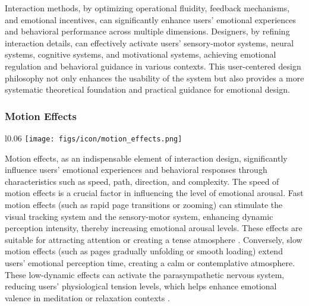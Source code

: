 Interaction methods, by optimizing operational fluidity, feedback mechanisms, and emotional incentives, can significantly enhance users’ emotional experiences and behavioral performance across multiple dimensions. Designers, by refining interaction details, can effectively activate users’ sensory-motor systems, neural systems, cognitive systems, and motivational systems, achieving emotional regulation and behavioral guidance in various contexts. This user-centered design philosophy not only enhances the usability of the system but also provides a more systematic theoretical foundation and practical guidance for emotional design.

\subsubsection{Motion Effects}
\begin{wrapfigure}{l}{0.06\textwidth}
        \texttt{[image: figs/icon/motion\_effects.png]}
\end{wrapfigure} 
Motion effects, as an indispensable element of interaction design, significantly influence users’ emotional experiences and behavioral responses through characteristics such as speed, path, direction, and complexity.
The speed of motion effects is a crucial factor in influencing the level of emotional arousal. Fast motion effects (such as rapid page transitions or zooming) can stimulate the visual tracking system and the sensory-motor system, enhancing dynamic perception intensity, thereby increasing emotional arousal levels. These effects are suitable for attracting attention or creating a tense atmosphere \cite{hanjalic2005affective}. Conversely, slow motion effects (such as pages gradually unfolding or smooth loading) extend users’ emotional perception time, creating a calm or contemplative atmosphere. These low-dynamic effects can activate the parasympathetic nervous system, reducing users’ physiological tension levels, which helps enhance emotional valence in meditation or relaxation contexts \cite{wollner2018slow}.

